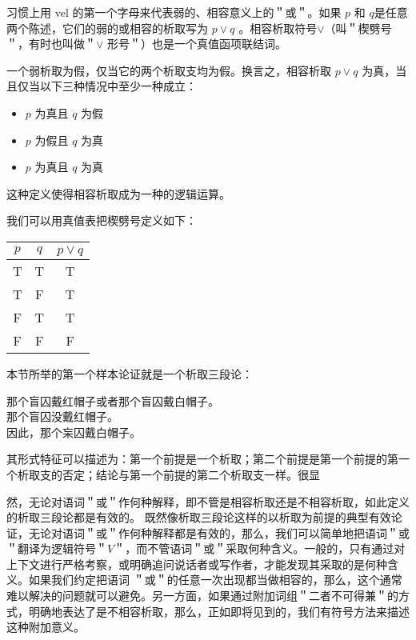 习惯上用 vel 的第一个字母来代表弱的、相容意义上的＂或＂。如果 $p$ 和 $q$是任意两个陈述，它们的弱的或相容的析取写为 $p \vee q$ 。相容析取符号$\vee$（叫＂楔劈号＂，有时也叫做＂$\vee$ 形号＂）也是一个真值函项联结词。

\begin{theorembox}[title=相容析取的真值条件]
一个弱析取为假，仅当它的两个析取支均为假。换言之，相容析取 $p \vee q$ 为真，当且仅当以下三种情况中至少一种成立：
\begin{itemize}
\item $p$ 为真且 $q$ 为假
\item $p$ 为假且 $q$ 为真
\item $p$ 为真且 $q$ 为真
\end{itemize}
这种定义使得相容析取成为一种的逻辑运算。
\end{theorembox}

我们可以用真值表把楔劈号定义如下：

\begin{center}
\begin{tabular}{|ccc|}
\hline
$p$ & $q$ & $p \vee q$ \\
\hline
T & T & T \\
T & F & T \\
F & T & T \\
F & F & F \\
\hline
\end{tabular}
\end{center}

本节所举的第一个样本论证就是一个析取三段论\cite{boole1854}：

那个盲囚戴红帽子或者那个盲囚戴白帽子。\\
那个盲囚没戴红帽子。\\
因此，那个杗囚戴白帽子。

其形式特征可以描述为：第一个前提是一个析取；第二个前提是第一个前提的第一个析取支的否定；结论与第一个前提的第二个析取支一样。很显

然，无论对语词＂或＂作何种解释，即不管是相容析取还是不相容析取，如此定义的析取三段论都是有效的。\cite{russell1903} 既然像析取三段论这样的以析取为前提的典型有效论证，无论对语词＂或＂作何种解释都是有效的，那么，我们可以简单地把语词＂或＂翻译为逻辑符号＂$V$＂，而不管语词＂或＂采取何种含义。一般的，只有通过对上下文进行严格考察，或明确追问说话者或写作者，才能发现其采取的是何种含义。如果我们约定把语词 ＂或＂的任意一次出现都当做相容的，那么，这个通常难以解决的问题就可以避免。另一方面，如果通过附加词组＂二者不可得兼＂的方式，明确地表达了是不相容析取，那么，正如即将见到的，我们有符号方法来描述这种附加意义。

